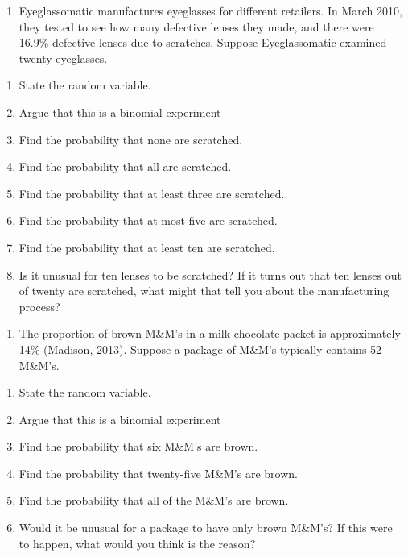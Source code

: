 \documentclass[
]{book}
\providecommand{\tightlist}{%
  \setlength{\itemsep}{0pt}\setlength{\parskip}{0pt}}
\begin{document}
\begin{enumerate}
\def\labelenumi{\arabic{enumi}.}
\setcounter{enumi}{2}
\tightlist
\item
  Eyeglassomatic manufactures eyeglasses for different retailers. In March 2010, they tested to see how many defective lenses they made, and there were 16.9\% defective lenses due to scratches. Suppose Eyeglassomatic examined twenty eyeglasses.
\end{enumerate}

\begin{enumerate}
\def\labelenumi{\alph{enumi}.}
\tightlist
\item
  State the random variable.
\item
  Argue that this is a binomial experiment
\item
  Find the probability that none are scratched.
\item
  Find the probability that all are scratched.
\item
  Find the probability that at least three are scratched.
\item
  Find the probability that at most five are scratched.
\item
  Find the probability that at least ten are scratched.
\item
  Is it unusual for ten lenses to be scratched? If it turns out that ten lenses out of twenty are scratched, what might that tell you about the manufacturing process?
\end{enumerate}

\begin{enumerate}
\def\labelenumi{\arabic{enumi}.}
\setcounter{enumi}{3}
\tightlist
\item
  The proportion of brown M\&M's in a milk chocolate packet is approximately 14\% (Madison, 2013). Suppose a package of M\&M's typically contains 52 M\&M's.
\end{enumerate}

\begin{enumerate}
\def\labelenumi{\alph{enumi}.}
\tightlist
\item
  State the random variable.
\item
  Argue that this is a binomial experiment
\item
  Find the probability that six M\&M's are brown.
\item
  Find the probability that twenty-five M\&M's are brown.
\item
  Find the probability that all of the M\&M's are brown.
\item
  Would it be unusual for a package to have only brown M\&M's? If this were to happen, what would you think is the reason?
\end{enumerate}
\end{document}
